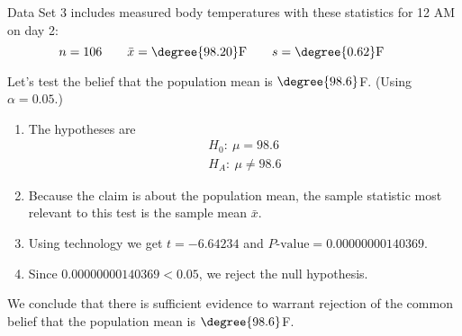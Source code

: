\documentclass{beamer}
\newcommand{\nullhypothesis}[1]{H_0:~{#1}}
\newcommand{\althypothesis}[1]{H_A:~{#1}}
\begin{document}
\begin{frame}
\begin{example}
Data Set 3  includes measured body temperatures with these statistics for 12 AM on day 2:
\vspace{-1mm}
\begin{equation*}
n=106\qquad
\bar{x}=\degree{98.20}\text{F}\qquad
s=\degree{0.62}\text{F}\qquad
\end{equation*}\pause

\vspace{-5mm}
Let's test the belief that the population mean is $\degree{98.6}$F. (Using $\alpha=0.05$.)\pause
\begin{enumerate}
\item The hypotheses are
\begin{equation*}
\begin{aligned}
\nullhypothesis{\mu=98.6} \\
\althypothesis{\mu\neq98.6}
\end{aligned}
\end{equation*}\pause
\vspace{-3mm}
\item Because the claim is about the population mean, the sample statistic most relevant to this test is the sample mean $\bar{x}$.\pause
\item Using technology we get $t=-6.64234$ and $P\text{-value}=0.00000000140369$.\pause
\item Since $0.00000000140369<0.05$, we reject the null hypothesis.\pause
\end{enumerate}
We conclude that there is sufficient evidence to warrant rejection of the common belief that the population mean is $\degree{98.6}$F.
\end{example}
\end{frame}
\end{document}
